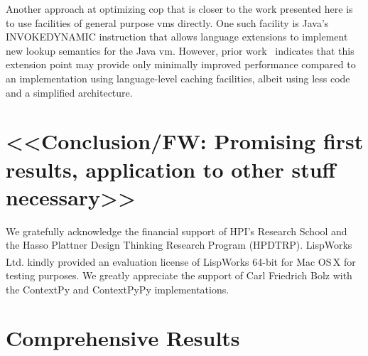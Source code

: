 \documentclass[preprint,english,10pt,nonatbib]{sigplanconf}
\begin{document}
Another approach at optimizing \ac{cop} that is closer to the work presented
here is to use facilities of general purpose \acp{vm} directly. One such
facility is Java's INVOKEDYNAMIC instruction that allows language extensions to
implement new lookup semantics for the Java \ac{vm}. However, prior
work~\cite{appeltauer2010layered} indicates that this extension point may
provide only minimally improved performance compared to an implementation using
language-level caching facilities, albeit using less code and a simplified
architecture.

\section{<<Conclusion/FW: Promising first results, application to other stuff necessary>>}

\acks
We gratefully acknowledge the financial support of HPI's Research School and
the Hasso Plattner Design Thinking Research Program (HPDTRP).
LispWorks Ltd. kindly provided an evaluation license of
LispWorks\textsuperscript{\textregistered} 64-bit for Mac OS\,X for testing
purposes. We greatly appreciate the support of Carl Friedrich Bolz with the
ContextPy and ContextPyPy implementations.
\printbibliography
\appendix
{}
\section{Comprehensive Results}


\end{document}
